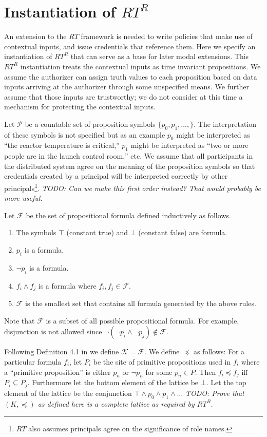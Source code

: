 \documentclass{article}
\newcommand{\todo}[1]{\textit{TODO: #1}}
\newcommand{\po}{\preccurlyeq}
\begin{document}
\section{Instantiation of $RT^R$}

An extension to the $RT$ framework is needed to write policies that make use of contextual
inputs, and issue credentials that reference them. Here we specify an instantiation of $RT^R$
that can serve as a base for later modal extensions. This $RT^R$ instantiation treats the
contextual inputs as time invariant propositions. We assume the authorizer can assign truth
values to each proposition based on data inputs arriving at the authorizer through some
unspecified means. We further assume that those inputs are trustworthy; we do not consider at
this time a mechanism for protecting the contextual inputs.

Let $\mathcal{P}$ be a countable set of proposition symbols $\{ p_0, p_1, \ldots, \}$. The
interpretation of these symbols is not specified but as an example $p_0$ might be interpreted as
``the reactor temperature is critical,'' $p_1$ might be interpreted as ``two or more people are
in the launch control room,'' etc. We assume that all participants in the distributed system
agree on the meaning of the proposition symbols so that credentials created by a principal will
be interpreted correctly by other principals\footnote{$RT$ also assumes principals agree on the
  significance of role names.}. \todo{Can we make this first order instead? That would probably
  be more useful.}

Let $\mathcal{F}$ be the set of propositional formula defined inductively as follows.
\begin{enumerate}
\item The symbols $\top$ (constant true) and $\bot$ (constant false) are formula.
\item $p_i$ is a formula.
\item $\neg p_i$ is a formula.
\item $f_i \wedge f_j$ is a formula where $f_i, f_j \in \mathcal{F}$.
\item $\mathcal{F}$ is the smallest set that contains all formula generated by the above rules.
\end{enumerate}

Note that $\mathcal{F}$ is a subset of all possible propositional formula. For example,
disjunction is not allowed since $\neg (\neg p_i \wedge \neg p_j) \notin \mathcal{F}$.

Following Definition 4.1 in \cite{Skalka:RMDA} we define $\mathcal{K} = \mathcal{F}$. We define
$\po$ as follows: For a particular formula $f_i$, let $P_i$ be the site of primitive
propositions used in $f_i$ where a ``primitive proposition'' is either $p_n$ or $\neg p_n$ for
some $p_n \in P$. Then $f_i \po f_j$ iff $P_i \subseteq P_j$. Furthermore let the bottom element
of the lattice be $\bot$. Let the top element of the lattice be the conjunction $\top \wedge p_0
\wedge p_1 \wedge \ldots$ \todo{Prove that $(K, \po)$ as defined here is a complete lattice as
  required by $RT^R$}.
\end{document}
